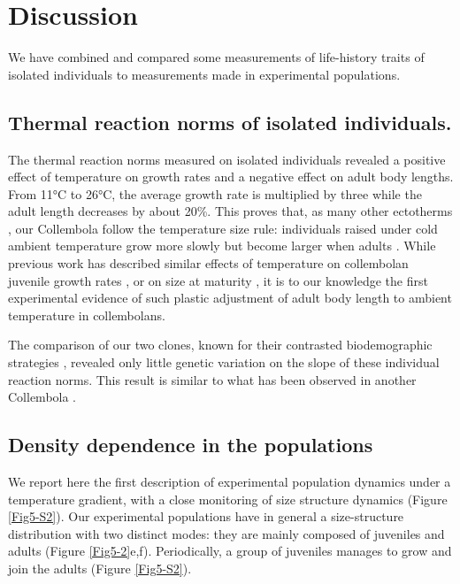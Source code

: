 \section{Discussion}

We have combined and compared some measurements of life-history traits of
isolated individuals to measurements made in experimental populations.

\subsection{Thermal reaction norms of isolated individuals.}

The thermal reaction norms measured on isolated individuals revealed a positive
effect of temperature on growth rates and a negative effect on adult body
lengths. From 11°C to 26°C, the average growth rate is multiplied by three while
the adult length decreases by about 20\%. This proves that, as many other
ectotherms \autocites{atkinson1994a,angilletta2009a}, our
Collembola follow the temperature size rule: individuals raised under cold ambient temperature grow
more slowly but become larger when adults \autocites{angilletta2003a}.
While previous work has described similar effects of temperature on collembolan
juvenile growth rates
\autocites{birkemoe2000a,driessen2007a,ellers2008a,ellers2011a}, or on size at
maturity \autocites{stam1996a}, it is to our knowledge the first experimental
evidence of such plastic adjustment of adult body length to ambient temperature in collembolans.

The comparison of our two clones, known for their contrasted biodemographic
strategies \autocites{tully2006a}, revealed only little genetic
variation on the slope of these individual reaction norms. This result is similar to what has
been observed in another Collembola \autocites{driessen2007a}.

\subsection{Density dependence in the populations}

We report here the first description of experimental population dynamics under a
temperature gradient, with a close monitoring of size structure dynamics
(Figure \ref{Fig5-S2}). Our experimental populations have in general a
size-structure distribution with two distinct modes: they are mainly composed of
juveniles and adults (Figure \ref{Fig5-2}e,f). Periodically, a group of
juveniles manages to grow and join the adults (Figure \ref{Fig5-S2}).


